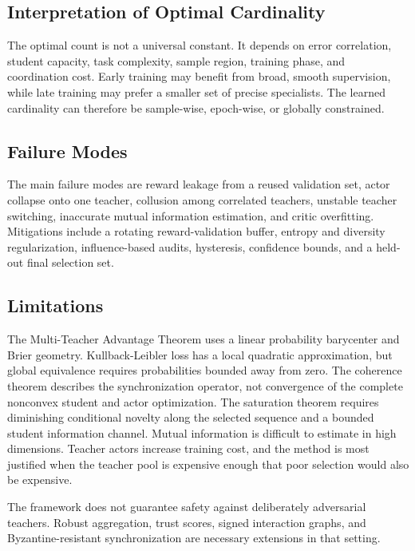 \documentclass[10pt,twocolumn,a4paper]{article}
\begin{document}
\subsection{Interpretation of Optimal Cardinality}

The optimal count is not a universal constant. It depends on error correlation, student capacity, task complexity, sample region, training phase, and coordination cost. Early training may benefit from broad, smooth supervision, while late training may prefer a smaller set of precise specialists. The learned cardinality can therefore be sample-wise, epoch-wise, or globally constrained.

\subsection{Failure Modes}

The main failure modes are reward leakage from a reused validation set, actor collapse onto one teacher, collusion among correlated teachers, unstable teacher switching, inaccurate mutual information estimation, and critic overfitting. Mitigations include a rotating reward-validation buffer, entropy and diversity regularization, influence-based audits, hysteresis, confidence bounds, and a held-out final selection set.

\subsection{Limitations}

The Multi-Teacher Advantage Theorem uses a linear probability barycenter and Brier geometry. Kullback-Leibler loss has a local quadratic approximation, but global equivalence requires probabilities bounded away from zero. The coherence theorem describes the synchronization operator, not convergence of the complete nonconvex student and actor optimization. The saturation theorem requires diminishing conditional novelty along the selected sequence and a bounded student information channel. Mutual information is difficult to estimate in high dimensions. Teacher actors increase training cost, and the method is most justified when the teacher pool is expensive enough that poor selection would also be expensive.

The framework does not guarantee safety against deliberately adversarial teachers. Robust aggregation, trust scores, signed interaction graphs, and Byzantine-resistant synchronization are necessary extensions in that setting.
\end{document}
